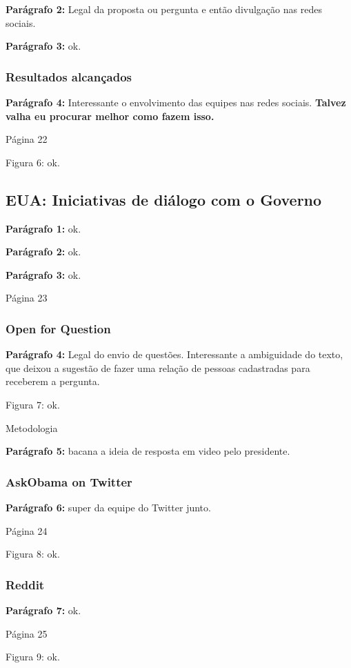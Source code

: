 \documentclass[12pt]{report}
\newcommand{\pp}[1]{

\textbf{Parágrafo #1:}
}
\begin{document}
\pp{2} Legal da proposta ou pergunta e então divulgação nas redes sociais.

\pp{3} ok.

\subsubsection{Resultados alcançados}

\pp{4} Interessante o envolvimento das equipes nas redes sociais. {\bf \color{red} Talvez valha eu procurar melhor como fazem isso.}

\noindent Página 22

Figura 6: ok.

\subsection{EUA: Iniciativas de diálogo com o Governo}

\pp{1} ok.

\pp{2} ok.

\pp{3} ok.

\noindent Página 23

\subsubsection{Open for Question}

\pp{4} Legal do envio de questões. Interessante a ambiguidade do texto, que deixou a sugestão de fazer uma relação de pessoas cadastradas para receberem a pergunta.

Figura 7: ok.

Metodologia

\pp{5} bacana a ideia de resposta em video pelo presidente.

\subsubsection{AskObama on Twitter}

\pp{6} super da equipe do Twitter junto.

\noindent Página 24

Figura 8: ok.

\subsubsection{Reddit}

\pp{7} ok.

\noindent Página 25

Figura 9: ok.
\end{document}
